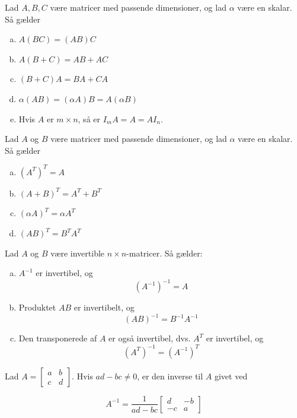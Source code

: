 \begin{theorem}
        Lad $A, B, C$ være matricer med passende dimensioner, og lad $\alpha$ være en skalar. Så gælder
\begin{enumerate}[(a)]
    \item $A(BC) = (AB)C$
    \item $A(B + C) = AB + AC$
    \item $(B + C)A = BA + CA$
    \item $\alpha(AB) = (\alpha A)B = A(\alpha B)$
    \item Hvis $A$ er $m\times n$, så er $I_mA=A=AI_n$.
\end{enumerate}
\end{theorem}

\begin{theorem}
    Lad $A$ og $B$ være matricer med passende dimensioner, og lad $\alpha$ være en skalar. Så gælder
    \begin{enumerate}[(a)]
        \item $(A^T)^T = A$
        \item $(A + B)^T = A^T + B^T$
        \item $(\alpha A)^T = \alpha A^T$
        \item $(AB)^T = B^T A^T$
    \end{enumerate}
\end{theorem}

\begin{theorem} Lad $A$ og $B$ være invertible $n \times n$-matricer. Så gælder:
\begin{enumerate}[(a)]
    \item $A^{-1}$ er invertibel, og
    \[
    \left(A^{-1}\right)^{-1}=A
    \]
    \item Produktet $A B$ er invertibelt, og
    \[
    (A B)^{-1}=B^{-1} A^{-1}
    \]
    \item Den transponerede af $A$ er også invertibel, dvs. $A^T$ er invertibel, og
    \[
    \left(A^T\right)^{-1}=\left(A^{-1}\right)^T
    \]
\end{enumerate}

\end{theorem}

\begin{theorem}
    Lad $A=\left[\begin{array}{ll}
    a & b \\
    c & d
    \end{array}\right]$. Hvis $ad-bc \neq 0$, er den inverse til $A$ givet ved

    \[
    A^{-1}=\frac{1}{ad-bc}\left[\begin{array}{cc}
    d & -b \\
    -c & a
    \end{array}\right]
    \]
\end{theorem}

